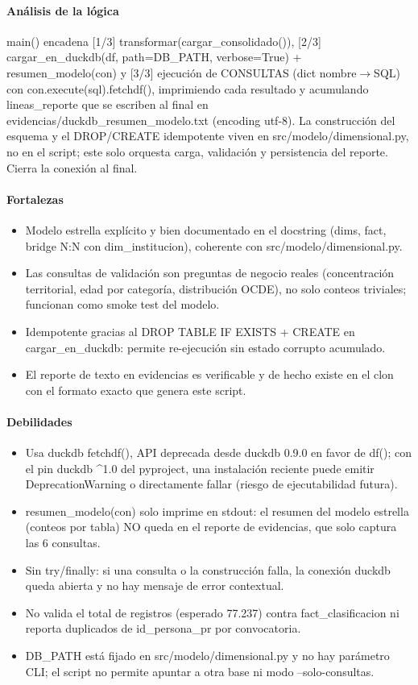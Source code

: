 \paragraph{Análisis de la lógica}
main() encadena [1/3] transformar(cargar\_consolidado()), [2/3] cargar\_en\_duckdb(df, path=DB\_PATH, verbose=True) + resumen\_modelo(con) y [3/3] ejecución de CONSULTAS (dict nombre$\rightarrow$SQL) con con.execute(sql).fetchdf(), imprimiendo cada resultado y acumulando lineas\_reporte que se escriben al final en evidencias/duckdb\_resumen\_modelo.txt (encoding utf-8). La construcción del esquema y el DROP/CREATE idempotente viven en src/modelo/dimensional.py, no en el script; este solo orquesta carga, validación y persistencia del reporte. Cierra la conexión al final.

\paragraph{Fortalezas}
\begin{itemize}
  \item Modelo estrella explícito y bien documentado en el docstring (dims, fact, bridge N:N con dim\_institucion), coherente con src/modelo/dimensional.py.
  \item Las consultas de validación son preguntas de negocio reales (concentración territorial, edad por categoría, distribución OCDE), no solo conteos triviales; funcionan como smoke test del modelo.
  \item Idempotente gracias al DROP TABLE IF EXISTS + CREATE en cargar\_en\_duckdb: permite re-ejecución sin estado corrupto acumulado.
  \item El reporte de texto en evidencias es verificable y de hecho existe en el clon con el formato exacto que genera este script.
\end{itemize}

\paragraph{Debilidades}
\begin{itemize}
  \item Usa duckdb fetchdf(), API deprecada desde duckdb 0.9.0 en favor de df(); con el pin duckdb \textasciicircum{}1.0 del pyproject, una instalación reciente puede emitir DeprecationWarning o directamente fallar (riesgo de ejecutabilidad futura).
  \item resumen\_modelo(con) solo imprime en stdout: el resumen del modelo estrella (conteos por tabla) NO queda en el reporte de evidencias, que solo captura las 6 consultas.
  \item Sin try/finally: si una consulta o la construcción falla, la conexión duckdb queda abierta y no hay mensaje de error contextual.
  \item No valida el total de registros (esperado 77.237) contra fact\_clasificacion ni reporta duplicados de id\_persona\_pr por convocatoria.
  \item DB\_PATH está fijado en src/modelo/dimensional.py y no hay parámetro CLI; el script no permite apuntar a otra base ni modo --solo-consultas.
\end{itemize}

